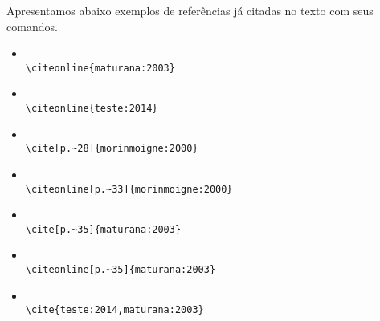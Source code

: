 Apresentamos abaixo exemplos de referências já citadas no texto com seus comandos.

\begin{itemize}
	\item {}\\ \verb|\citeonline{maturana:2003}|
	\item {}\\ \verb|\citeonline{teste:2014}|
	\item \cite[p.~28]{morinmoigne:2000}\\ \verb|\cite[p.~28]{morinmoigne:2000}|
	\item {}\\ \verb|\citeonline[p.~33]{morinmoigne:2000}|
	\item \cite[p.~35]{maturana:2003}\\ \verb|\cite[p.~35]{maturana:2003}|
	\item {}\\ \verb|\citeonline[p.~35]{maturana:2003}|
	\item \cite{teste:2014,maturana:2003}\\ \verb|\cite{teste:2014,maturana:2003}|
\end{itemize}
